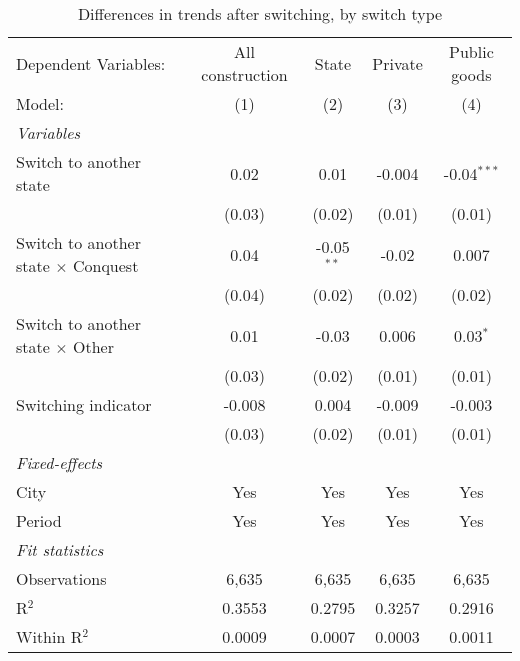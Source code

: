 \begin{table}[htbp]
   \caption{\label{tab:baseline_50y} Differences in trends after switching, by switch type}
   \centering
   \begin{tabular}{lcccc}
      \tabularnewline \midrule \midrule
      Dependent Variables:                       & All construction & State        & Private & Public goods\\  
      Model:                                     & (1)              & (2)          & (3)     & (4)\\  
      \midrule
      \emph{Variables}\\
      Switch to another state                    & 0.02             & 0.01         & -0.004  & -0.04$^{***}$\\   
                                                 & (0.03)           & (0.02)       & (0.01)  & (0.01)\\   
      Switch to another state $\times$ Conquest  & 0.04             & -0.05$^{**}$ & -0.02   & 0.007\\   
                                                 & (0.04)           & (0.02)       & (0.02)  & (0.02)\\   
      Switch to another state $\times$ Other     & 0.01             & -0.03        & 0.006   & 0.03$^{*}$\\   
                                                 & (0.03)           & (0.02)       & (0.01)  & (0.01)\\   
      Switching indicator                        & -0.008           & 0.004        & -0.009  & -0.003\\   
                                                 & (0.03)           & (0.02)       & (0.01)  & (0.01)\\   
      \midrule
      \emph{Fixed-effects}\\
      City                                       & Yes              & Yes          & Yes     & Yes\\  
      Period                                     & Yes              & Yes          & Yes     & Yes\\  
      \midrule
      \emph{Fit statistics}\\
      Observations                               & 6,635            & 6,635        & 6,635   & 6,635\\  
      R$^2$                                      & 0.3553           & 0.2795       & 0.3257  & 0.2916\\  
      Within R$^2$                               & 0.0009           & 0.0007       & 0.0003  & 0.0011\\  
      \midrule \midrule
      

\end{tabular}
\end{table}
